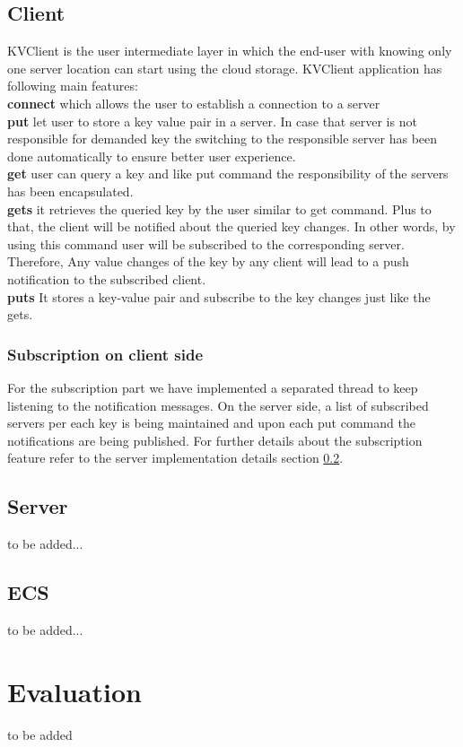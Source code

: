 \documentclass{sig-alternate}
\begin{document}
\subsection{Client}
KVClient is the user intermediate layer in which the end-user with knowing only one server location can start using the cloud storage. KVClient application has following main features: \\
\textbf{connect} which allows the user to establish a connection to a server\\
\textbf{put} let user to store a key value pair in a server. In case that server is not responsible for demanded key the switching to the responsible server has been done automatically to ensure better user experience.\\
\textbf{get} user can query a key and like put command the responsibility of the servers has been encapsulated.\\
\textbf{gets} it retrieves the queried key by the user similar to get command. Plus to that, the client will be notified about the queried  key changes. In other words, by using this command user will be subscribed to the corresponding server. Therefore, Any value changes of the key by any client will lead to a push notification to the subscribed client.\\
\textbf{puts} It stores a key-value pair and subscribe to the key changes just like the gets.\\
\subsubsection{Subscription on client side}
For the subscription part we have implemented a separated thread to keep listening to the notification messages. On the server side, a list of subscribed servers per each key is being maintained and upon each put command the notifications are being published. For further details about the subscription feature refer to the server implementation details section \ref{serverimpl}.

\subsection{Server}\label{serverimpl}
to be added...
\subsection{ECS}
to be added...
\section{Evaluation}
to be added
\end{document}
